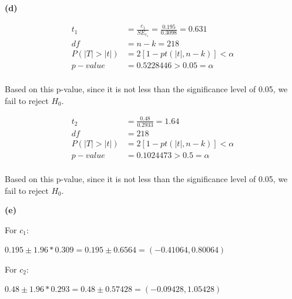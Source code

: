 \documentclass[11pt]{article}
\renewcommand\part[1]{\vspace{.10in}\textbf{(#1)}\par}
\begin{document}
	\part{d}
		\begin{align*}
			t_{1} &= \frac{c_{1}}{SE_{c_{1}}} = \frac{0.195}{0.3098} = 0.631\\
			df &= n-k =218\\
			P(|T| > |t|) &= 2[1-pt(|t|, n-k)] < \alpha \\
			p-value &= 0.5228446 > 0.05 = \alpha\\
		\end{align*}\par
		Based on this p-value, since it is not less than the significance level of 0.05, we fail to reject $H_{0}$.\par
		\begin{align*}
			t_{2} &= \frac{0.48}{0.2933} = 1.64\\
			df &= 218\\
			P(|T| > |t|) &= 2[1-pt(|t|, n-k)] < \alpha \\
			p-value &= 0.1024473 > 0.5 = \alpha\\
		\end{align*}\par
		Based on this p-value, since it is not less than the significance level of 0.05, we fail to reject $H_{0}$.\par
	
	\part{e}
		For $c_{1}$:\par
		$0.195 \pm 1.96 * 0.309 = 0.195 \pm 0.6564 = (-0.41064, 0.80064)$\par
		For $c_{2}$:\par
		$0.48 \pm 1.96 * 0.293 = 0.48 \pm 0.57428 = (-0.09428, 1.05428)$\par
\end{document}
